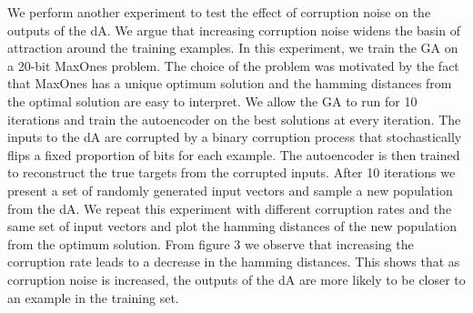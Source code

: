 \documentclass[runningheads,a4paper]{llncs}
\begin{document}

We perform another experiment to test the effect of corruption noise on the outputs of the dA. We argue that increasing corruption noise widens the basin of attraction around the training examples. In this experiment, we train the GA on a 20-bit MaxOnes problem. The choice of the problem was motivated by the fact that MaxOnes has a unique optimum solution and the hamming distances from the optimal solution are easy to interpret. We allow the GA to run for 10 iterations and train the autoencoder on the best solutions at every iteration. The inputs to the dA are corrupted by a binary corruption process that stochastically flips a fixed proportion of bits for each example. The autoencoder is then trained to reconstruct the true targets from the corrupted inputs. After 10 iterations we present a set of randomly generated input vectors and sample a new population from the dA. We repeat this experiment with different corruption rates and the same set of input vectors and  plot the hamming distances of the new population from the optimum solution. From figure 3 we observe that increasing the corruption rate leads to a decrease in the hamming distances. This shows that as corruption noise is increased, the outputs of the dA are more likely to be closer to an example in the training set. 



\end{document}
